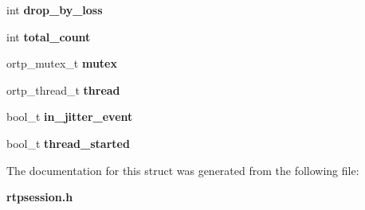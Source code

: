 \begin{DoxyCompactItemize}
int {\bfseries drop\+\_\+by\+\_\+loss}
\item 
\mbox{\label{struct__OrtpNetworkSimulatorCtx_aaf8dd3dec4130820835f1212b06d8be3}} 
int {\bfseries total\+\_\+count}
\item 
\mbox{\label{struct__OrtpNetworkSimulatorCtx_a12c5f6870ceea04d1ca9643842b70c35}} 
ortp\+\_\+mutex\+\_\+t {\bfseries mutex}
\item 
\mbox{\label{struct__OrtpNetworkSimulatorCtx_a3985d0fc528143fd9ab8e5ba5b5e3c38}} 
ortp\+\_\+thread\+\_\+t {\bfseries thread}
\item 
\mbox{\label{struct__OrtpNetworkSimulatorCtx_ab424a0e40abd6defdab0a5e1da41ae7c}} 
bool\+\_\+t {\bfseries in\+\_\+jitter\+\_\+event}
\item 
\mbox{\label{struct__OrtpNetworkSimulatorCtx_a21b622eac2eaacd2b18f6e42083d47b4}} 
bool\+\_\+t {\bfseries thread\+\_\+started}
\end{DoxyCompactItemize}


The documentation for this struct was generated from the following file\+:\begin{DoxyCompactItemize}
\item 
\textbf{ rtpsession.\+h}\end{DoxyCompactItemize}
